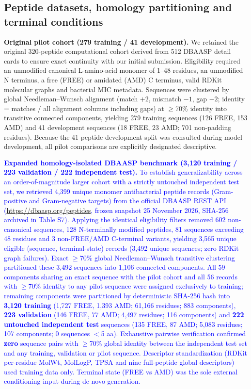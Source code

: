 \documentclass[unnumsec,webpdf,contemporary,large]{oup-authoring-template}
\newcommand{\rev}[1]{\textcolor{blue}{#1}}
\begin{document}
\subsection{Peptide datasets, homology partitioning and terminal conditions}

\textbf{Original pilot cohort (279 training / 41 development).} We retained the original 320-peptide computational cohort derived from 512 DBAASP detail cards \cite{ref10} to ensure exact continuity with our initial submission. Eligibility required an unmodified canonical L-amino-acid monomer of 1--48 residues, an unmodified N terminus, a free (FREE) or amidated (AMD) C terminus, valid RDKit molecular graphs and bacterial MIC metadata. Sequences were clustered by global Needleman--Wunsch alignment \cite{refNW} (match $+2$, mismatch $-1$, gap $-2$; identity = matches / all alignment columns including gaps) at $\geq$70\% identity into transitive connected components, yielding 279 training sequences (126 FREE, 153 AMD) and 41 development sequences (18 FREE, 23 AMD; 701 non-padding residues). Because the 41-peptide development split was consulted during model development, all pilot comparisons are explicitly designated descriptive.

\rev{\textbf{Expanded homology-isolated DBAASP benchmark (3,120 training / 223 validation / 222 independent test).} To establish generalizability across an order-of-magnitude larger cohort with a strictly untouched independent test set, we retrieved 4,399 unique monomer antibacterial peptide records (Gram-positive and Gram-negative targets) from the official DBAASP REST API (\url{https://dbaasp.org/peptides}, frozen snapshot 25 November 2026, SHA-256 archived in Table S7). Applying the identical eligibility filters removed 602 non-canonical sequences, 128 N-terminally modified peptides, 81 sequences exceeding 48 residues and 3 non-FREE/AMD C-terminal variants, yielding 3,565 unique eligible (sequence, terminal-state) records (3,492 unique sequences; zero RDKit graph failures). Exact $\geq$70\% global Needleman--Wunsch transitive clustering partitioned these 3,492 sequences into 1,106 connected components. All 59 components sharing an exact sequence with the pilot cohort and all 56 records with $\geq$70\% identity to any pilot sequence were assigned exclusively to training; remaining components were partitioned by deterministic SHA-256 hash into \textbf{3,120 training} (1,727 FREE, 1,393 AMD; 61,166 residues; 883 components), \textbf{223 validation} (146 FREE, 77 AMD; 4,497 residues; 116 components) and \textbf{222 untouched independent test} sequences (135 FREE, 87 AMD; 5,083 residues; 107 components; 0 sequences $<$5 aa). Exhaustive pairwise verification confirmed \textbf{zero} sequence pairs with $\geq$70\% global identity between the independent test set and any training, validation or pilot sequence. Descriptor standardization (RDKit per-residue MolWt, MolLogP, TPSA and nine full-peptide global descriptors) used training data only. Terminal state (FREE vs AMD) was the sole external conditioning input during de novo generation.}
\end{document}
